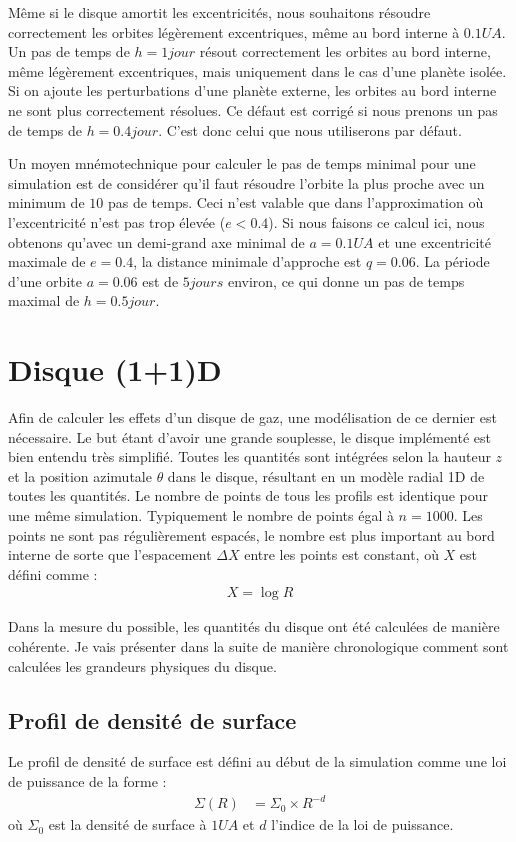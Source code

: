 Même si le disque amortit les excentricités, nous souhaitons résoudre correctement les orbites légèrement excentriques, même au bord interne à $0.1\unit{UA}$. Un pas de temps de $h=1\unit{jour}$ résout correctement les orbites au bord interne, même légèrement excentriques, mais uniquement dans le cas d'une planète isolée. Si on ajoute les perturbations d'une planète externe, les orbites au bord interne ne sont plus correctement résolues. Ce défaut est corrigé si nous prenons un pas de temps de $h=0.4\unit{jour}$. C'est donc celui que nous utiliserons par défaut.

Un moyen mnémotechnique pour calculer le pas de temps minimal pour une simulation est de considérer qu'il faut résoudre l'orbite la plus proche avec un minimum de $10$ pas de temps. Ceci n'est valable que dans l'approximation où l'excentricité n'est pas trop élevée ($e<0.4$). Si nous faisons ce calcul ici, nous obtenons qu'avec un demi-grand axe minimal de $a=0.1\unit{UA}$ et une excentricité maximale de $e=0.4$, la distance minimale d'approche est $q=0.06$. La période d'une orbite $a=0.06$ est de $5\unit{jours}$ environ, ce qui donne un pas de temps maximal de $h=0.5\unit{jour}$. 

\section{Disque (1+1)D}
Afin de calculer les effets d'un disque de gaz, une modélisation de ce dernier est nécessaire. Le but étant d'avoir une grande
souplesse, le disque implémenté est bien entendu très simplifié. Toutes les quantités sont intégrées selon la hauteur $z$ et la
position azimutale $\theta$ dans le disque, résultant en un modèle radial 1D de toutes les quantités. Le nombre de points de
tous les profils est identique pour une même simulation. Typiquement le nombre de points égal à $n=1000$. Les points ne sont
pas régulièrement espacés, le nombre est plus important au bord interne de sorte que l'espacement $\Delta X$ entre les points
est constant, où $X$ est défini comme : 
\begin{align}
X = \log{R}
\end{align}

Dans la mesure du possible, les quantités du disque ont été calculées de manière cohérente. Je vais présenter dans la suite de manière chronologique comment sont calculées les grandeurs physiques du disque.

\subsection{Profil de densité de surface}
Le profil de densité de surface est défini au début de la simulation comme une loi de puissance de la forme :
\begin{align}
\Sigma(R) &= \Sigma_0 \times R^{-d}
\end{align}
où $\Sigma_0$ est la densité de surface à $1\unit{UA}$ et $d$ l'indice de la loi de puissance. 

